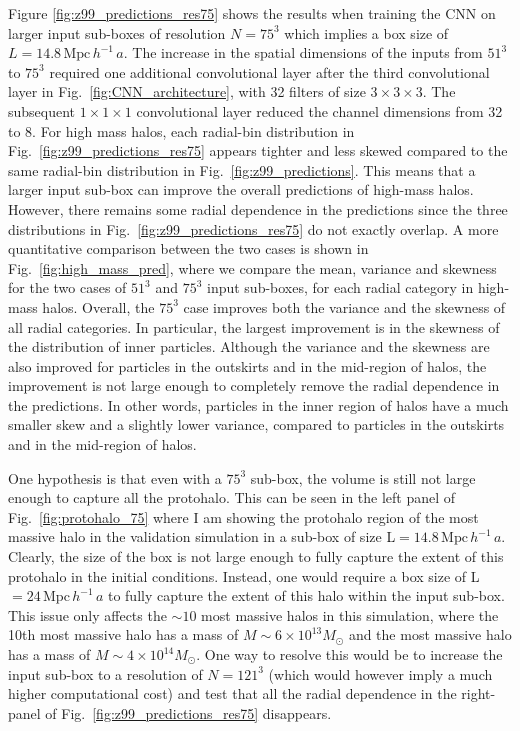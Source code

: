 \documentclass[11pt]{article}
\begin{document}
Figure \ref{fig:z99_predictions_res75} shows the results when training the CNN on larger input sub-boxes of resolution $N=75^3$ which implies a box size of $L=14.8 \, \mathrm{Mpc} \, h^{-1} \, a$. The increase in the spatial dimensions of the inputs from $51^3$ to $75^3$ required one additional convolutional layer after the third convolutional layer in Fig.~\ref{fig:CNN_architecture}, with 32 filters of size $3\times3\times3$. The subsequent $1\times1\times1$ convolutional layer reduced the channel dimensions from 32 to 8. For high mass halos, each radial-bin distribution in Fig.~\ref{fig:z99_predictions_res75} appears tighter and less skewed compared to the same radial-bin distribution in Fig.~\ref{fig:z99_predictions}. This means that a larger input sub-box can improve the overall predictions of high-mass halos. However, there remains some radial dependence in the predictions since the three distributions in Fig.~\ref{fig:z99_predictions_res75} do not exactly overlap. A more quantitative comparison between the two cases is shown in Fig.~\ref{fig:high_mass_pred}, where we compare the mean, variance and skewness for the two cases of $51^3$ and $75^3$ input sub-boxes, for each radial category in high-mass halos. Overall, the $75^3$ case improves both the variance and the skewness of all radial categories. In particular, the largest improvement is in the skewness of the distribution of inner particles. Although the variance and the skewness are also improved for particles in the outskirts and in the mid-region of halos, the improvement is not large enough to completely remove the radial dependence in the predictions. In other words, particles in the inner region of halos have a much smaller skew and a slightly lower variance, compared to particles in the outskirts and in the mid-region of halos. 

One hypothesis is that even with a $75^3$ sub-box, the volume is still not large enough to capture all the protohalo. This can be seen in the left panel of Fig.~\ref{fig:protohalo_75} where I am showing the protohalo region of the most massive halo in the validation simulation in a sub-box of size L$=14.8 \, \mathrm{Mpc} \, h^{-1} \, a$. Clearly, the size of the box is not large enough to fully capture the extent of this protohalo in the initial conditions. Instead, one would require a box size of L$=24 \, \mathrm{Mpc} \, h^{-1} \, a$ to fully capture the extent of this halo within the input sub-box. This issue only affects the $\sim 10$ most massive halos in this simulation, where the 10th most massive halo has a mass of $M\sim 6 \times 10^{13} M_\odot$ and the most massive halo has a mass of $M\sim 4 \times 10^{14} M_\odot$. One way to resolve this would be to increase the input sub-box to a resolution of $N=121^3$ (which would however imply a much higher computational cost) and test that all the radial dependence in the right-panel of Fig.~\ref{fig:z99_predictions_res75} disappears.
\end{document}
